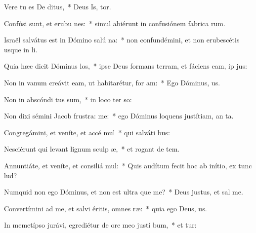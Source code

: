 \item Vere tu es De ditus,~* Deus Is, tor.
\item Confúsi sunt, et erubu nes:~* simul abiérunt in confusiónem fabrica rum.
\item Israël salvátus est in Dómino salú na:~* non confundémini, et non erubescétis usque in  li.
\item Quia hæc dicit Dóminus  los,~* ipse Deus formans terram, et fáciens eam, ip  jus:
\item Non in vanum creávit eam, ut habitarétur, for am:~* Ego Dóminus,    us.
\item Non in abscóndi tus sum,~* in loco ter so:
\item Non dixi sémini Jacob frustra:  me:~* ego Dóminus loquens justítiam, an ta.
\item Congregámini, et veníte, et accé mul~* qui salváti   bus:
\item Nesciérunt qui levant lignum sculp æ,~* et rogant de  tem.
\item Annuntiáte, et veníte, et consiliá mul:~* Quis audítum fecit hoc ab inítio, ex tunc  lud?
\item Numquid non ego Dóminus, et non est ultra  que me?~* Deus justus, et sal    me.
\item Convertímini ad me, et salvi éritis, omnes  ræ:~* quia ego Deus,    us.
\item In memetípso jurávi, egrediétur de ore meo justí bum,~* et  tur:
